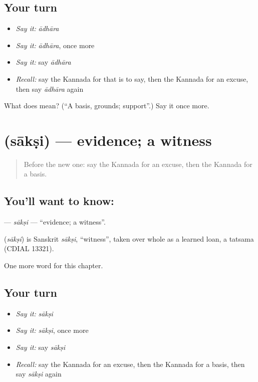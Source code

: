 \subsection*{Your turn}
\begin{itemize}
\raggedright
  \item \emph{Say it:} \emph{ādhāra}
  \item \emph{Say it:} \emph{ādhāra}, once more
  \item \emph{Say it:} say \emph{ādhāra}
  \item \emph{Recall:} say the Kannada for that is to say, then the Kannada for an excuse, then say \emph{ādhāra} again
\end{itemize}

\begin{tcolorbox}[breakable,colback=teal!4,colframe=teal!35!black,title={Before you move on}]
What does  mean? (\textquotedblleft{}A basis, grounds; support\textquotedblright{}.) Say it once more.
\end{tcolorbox}
\section[\texorpdfstring{\kn{ಸಾಕ್ಷಿ} (sākṣi)}{ಸಾಕ್ಷಿ (sākṣi)}]{ (sākṣi) — evidence; a witness}

\label{lesson:KA-C289-saksi}



\begin{quote}
Before the new one: say the Kannada for an excuse, then the Kannada for a basis.
\end{quote}

\subsection*{You'll want to know: }
\textbf{} — \emph{sākṣi} — \textquotedblleft{}evidence; a witness\textquotedblright{}.

\begin{cousinweb}
\textbf{} (\emph{sākṣi}) is Sanskrit \emph{sākṣi}, \textquotedblleft{}witness\textquotedblright{}, taken over whole as a learned loan, a tatsama (CDIAL 13321).
\end{cousinweb}

\begin{grammarlens}[title={What you've built}]
One more word for this chapter.
\end{grammarlens}

\subsection*{Your turn}
\begin{itemize}
\raggedright
  \item \emph{Say it:} \emph{sākṣi}
  \item \emph{Say it:} \emph{sākṣi}, once more
  \item \emph{Say it:} say \emph{sākṣi}
  \item \emph{Recall:} say the Kannada for an excuse, then the Kannada for a basis, then say \emph{sākṣi} again
\end{itemize}

